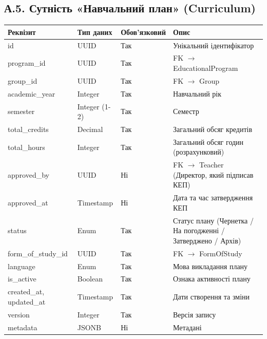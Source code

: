 \documentclass{article}
\begin{document}
\begin{appendix}
\subsection{А.5. Сутність «Навчальний план» (Curriculum)}
\begin{longtable}{p{3.5cm}p{3cm}p{2cm}p{5.5cm}}
\toprule
\textbf{Реквізит} & \textbf{Тип даних} & \textbf{Обов'язковий} & \textbf{Опис} \\
\midrule
id & UUID & Так & Унікальний ідентифікатор \\
program\_id & UUID & Так & FK $\rightarrow$ EducationalProgram \\
group\_id & UUID & Так & FK $\rightarrow$ Group \\
academic\_year & Integer & Так & Навчальний рік \\
semester & Integer (1-2) & Так & Семестр \\
total\_credits & Decimal & Так & Загальний обсяг кредитів \\
total\_hours & Integer & Так & Загальний обсяг годин (розрахунковий) \\
approved\_by & UUID & Ні & FK $\rightarrow$ Teacher (Директор, який підписав КЕП) \\
approved\_at & Timestamp & Ні & Дата та час затвердження КЕП \\
status & Enum & Так & Статус плану (Чернетка / На погодженні / Затверджено / Архів) \\
form\_of\_study\_id & UUID & Так & FK $\rightarrow$ FormOfStudy \\
language & Enum & Так & Мова викладання плану \\
is\_active & Boolean & Так & Ознака активності плану \\
created\_at, updated\_at & Timestamp & Так & Дати створення та зміни \\
version & Integer & Так & Версія запису \\
metadata & JSONB & Ні & Метадані \\
\bottomrule
\end{longtable}


\end{appendix}
\end{document}
